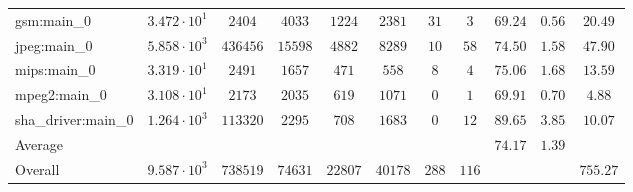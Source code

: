 \begin{tabular}{|l|c|c|c|c|c|c|c|c|c|c|}
gsm:main\_0             & $ 3.472 \cdot 10^{1} $ & $ 2404   $ & $ 4033  $ & $ 1224  $ & $ 2381  $ & $ 31  $ & $ 3   $ & $ 69.24       $ & $ 0.56    $ & $ 20.49   $ \\
jpeg:main\_0            & $ 5.858 \cdot 10^{3} $ & $ 436456 $ & $ 15598 $ & $ 4882  $ & $ 8289  $ & $ 10  $ & $ 58  $ & $ 74.50       $ & $ 1.58    $ & $ 47.90   $ \\
mips:main\_0            & $ 3.319 \cdot 10^{1} $ & $ 2491   $ & $ 1657  $ & $ 471   $ & $ 558   $ & $ 8   $ & $ 4   $ & $ 75.06       $ & $ 1.68    $ & $ 13.59   $ \\
mpeg2:main\_0           & $ 3.108 \cdot 10^{1} $ & $ 2173   $ & $ 2035  $ & $ 619   $ & $ 1071  $ & $ 0   $ & $ 1   $ & $ 69.91       $ & $ 0.70    $ & $ 4.88    $ \\
sha\_driver:main\_0     & $ 1.264 \cdot 10^{3} $ & $ 113320 $ & $ 2295  $ & $ 708   $ & $ 1683  $ & $ 0   $ & $ 12  $ & $ 89.65       $ & $ 3.85    $ & $ 10.07   $ \\
\hline
Average                 & $                    $ & $        $ & $       $ & $       $ & $       $ & $     $ & $     $ & $ 74.17       $ & $ 1.39    $ & $         $ \\
\hline
Overall                 & $ 9.587 \cdot 10^{3} $ & $ 738519 $ & $ 74631 $ & $ 22807 $ & $ 40178 $ & $ 288 $ & $ 116 $ & $             $ & $         $ & $ 755.27  $ \\
\hline
\end{tabular}
